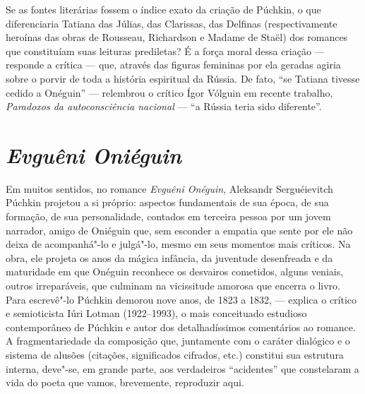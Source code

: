 Se as fontes literárias fossem o índice exato da criação de Púchkin, o
que diferenciaria Tatiana das Júlias, das Clarissas, das Delfinas
(respectivamente heroínas das obras de Rousseau, Richardson e Madame de
Staël) dos romances que constituíam suas leituras prediletas? É a força
moral dessa criação --- responde a crítica --- que, através das figuras
femininas por ela geradas agiria sobre o porvir de toda a história
espiritual da Rússia. De fato, ``se Tatiana tivesse cedido a Onéguin'' ---
relembrou o crítico Ígor Vólguin em recente trabalho, \emph{Paradoxos da
autoconsciência nacional} --- ``a Rússia teria sido diferente''.

\chapter{\emph{Evguêni Oniéguin}}

Em muitos sentidos, no romance \emph{Evguêni Onéguin},
Aleksandr Serguéievitch Púchkin
projetou a si próprio: aspectos fundamentais de sua época, de sua
formação, de sua personalidade, contados em terceira pessoa por um jovem
narrador, amigo de Oniéguin que, sem esconder a empatia que sente por
ele não deixa de acompanhá"-lo e julgá"-lo, mesmo em seus momentos mais
críticos. Na obra, ele projeta os anos da mágica infância, da juventude
desenfreada e da maturidade em que Onéguin reconhece os desvairos
cometidos, alguns veniais, outros irreparáveis, que culminam na
vicissitude amorosa que encerra o livro. Para escrevê"-lo Púchkin demorou
nove anos, de 1823 a 1832, --- explica o crítico e semioticista Iúri
Lotman (1922--1993), o mais conceituado estudioso contemporâneo de
Púchkin e autor dos detalhadíssimos comentários ao romance. A
fragmentariedade da composição que, juntamente com o caráter dialógico e
o sistema de alusões (citações, significados cifrados, etc.) constitui
sua estrutura interna, deve"-se, em grande parte, aos verdadeiros
``acidentes'' que constelaram a vida do poeta que vamos, brevemente,
reproduzir aqui.

